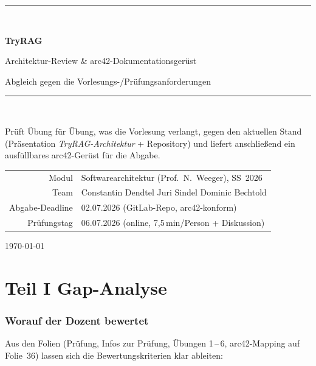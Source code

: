 \documentclass[11pt,a4paper]{article}
\begin{document}
\begin{titlepage}
\centering
\vspace*{2.2cm}
{\color{accent}\rule{\linewidth}{1.4pt}}\\[0.5cm]
{\Huge\bfseries TryRAG\par}
\vspace{0.35cm}
{\LARGE Architektur-Review \& arc42-Dokumentationsger\"ust\par}
\vspace{0.2cm}
{\large Abgleich gegen die Vorlesungs-/Pr\"ufungsanforderungen}
{\color{accent}\rule{\linewidth}{1.4pt}}\\[1.1cm]

\begin{minipage}{0.85\linewidth}
\centering\large
Pr\"uft \"Ubung f\"ur \"Ubung, was die Vorlesung verlangt, gegen den aktuellen Stand
(Pr\"asentation \emph{TryRAG-Architektur} + Repository) und liefert anschlie{\ss}end ein
ausf\"ullbares arc42-Ger\"ust f\"ur die Abgabe.
\end{minipage}

\vfill
\begin{tabular}{rl}
\toprule
Modul & Softwarearchitektur (Prof.\ N.\ Weeger), SS~2026\\
Team & Constantin Dendtel \textbullet{} Juri Sindel \textbullet{} Dominic Bechtold\\
Abgabe-Deadline & 02.07.2026 (GitLab-Repo, arc42-konform)\\
Pr\"ufungstag & 06.07.2026 (online, 7,5\,min/Person + Diskussion)\\
\bottomrule
\end{tabular}

\vspace{1.2cm}
{\color{ink}\today}
\end{titlepage}

\tableofcontents
\newpage

\part*{Teil I \textendash{} Gap-Analyse}

\section{Worauf der Dozent bewertet}
Aus den Folien (Pr\"ufung, Infos zur Pr\"ufung, \"Ubungen 1\,--\,6, arc42-Mapping
auf Folie~36) lassen sich die Bewertungskriterien klar ableiten:
\end{document}
